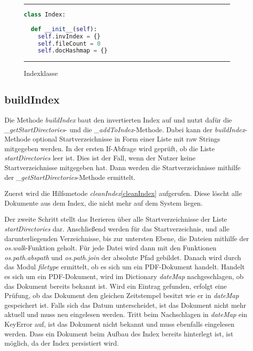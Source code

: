 \begin{figure}
	\rule{\textwidth}{0.4pt}
		\begin{lstlisting}[language=Python]
class Index:
  
  def __init__(self):
    self.invIndex = {}
    self.fileCount = 0
    self.docHashmap = {}
		\end{lstlisting}
	\rule{\textwidth}{0.4pt}
	\caption{Indexklasse}
	\label{fig:index}
\end{figure}

\subsection{buildIndex}\label{buildindex}

Die Methode \emph{buildIndex} baut den invertierten Index auf und nutzt dafür die\\
\textit{\_getStartDirectories}- und die \textit{\_addToIndex}-Methode. Dabei kann der \textit{buildIndex}-Methode optional Startverzeichnisse in Form einer Liste mit raw Strings mitgegeben werden. In der ersten If-Abfrage wird geprüft, ob die Liste \textit{startDirectories} leer ist. Dies ist der Fall, wenn der Nutzer keine Startverzeichnisse mitgegeben hat. Dann werden die Startverzeichnisse mithilfe der \textit{\_getStartDirectories}-Methode ermittelt.

Zuerst wird die Hilfsmetode \textit{cleanIndex}\ref{cleanIndex} aufgerufen. Diese löscht alle Dokumente aus dem Index, die nicht mehr auf dem System liegen.

Der zweite Schritt stellt das Iterieren über alle Startverzeichnisse der Liste \textit{startDirectories} dar. Anschließend werden für das Startverzeichnis, und alle darunterliegenden Verzeichnisse, bis zur untersten Ebene, die Dateien mithilfe der \textit{os.walk}-Funktion geholt. Für jede Datei wird dann mit den Funktionen \textit{os.path.abspath} und \textit{os.path.join} der absolute Pfad gebildet. Danach wird durch das Modul \textit{filetype} ermittelt, ob es sich um ein PDF-Dokument handelt. Handelt es sich um ein PDF-Dokument, wird im Dictionary \textit{dateMap} nachgeschlagen, ob das Dokument bereits bekannt ist. Wird ein Eintrag gefunden, erfolgt eine Prüfung, ob das Dokument den gleichen Zeitstempel besitzt wie er in \textit{dateMap} gespeichert ist. Falls sich das Datum unterscheidet, ist das Dokument nicht mehr aktuell und muss neu eingelesen werden. Tritt beim Nachschlagen in \textit{dateMap} ein KeyError auf, ist das Dokument nicht bekannt und muss ebenfalls eingelesen werden. Dass ein Dokument beim Aufbau des Index bereits hinterlegt ist, ist möglich, da der Index persistiert wird. 


